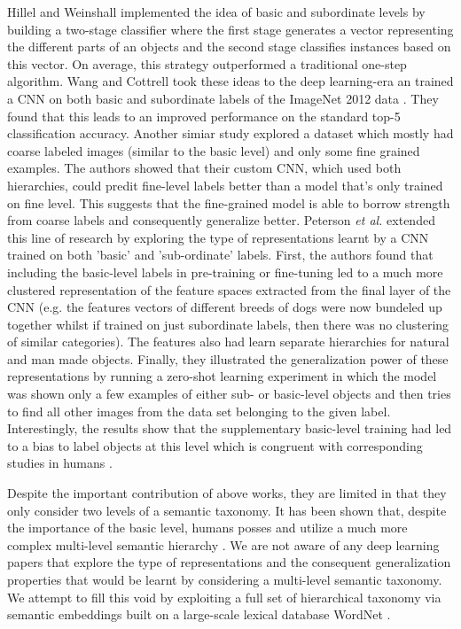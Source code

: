 \documentclass[12pt]{report}
\begin{document}
Hillel and Weinshall \cite{Hillel2007} implemented the idea of basic and subordinate levels by building a two-stage classifier where the first stage generates a vector representing the different parts of an objects and the second stage classifies instances based on this vector. On average, this strategy outperformed a traditional one-step algorithm. Wang and Cottrell \cite{Wang2015} took these ideas to the deep learning-era an trained a CNN on both basic and subordinate labels of the ImageNet 2012 data \cite{Russakovsky2015}. They found that this leads to an improved performance on the standard top-5 classification accuracy. Another simiar study \cite{Lei2018} explored a dataset which mostly had coarse labeled images (similar to the basic level) and only some fine grained examples. The authors showed that their custom CNN, which used both hierarchies, could predit fine-level labels better than a model that's only trained on fine level. This suggests that the fine-grained model is able to borrow strength from coarse labels and consequently generalize better. Peterson \textit{et al.} extended this line of research by exploring the type of representations learnt by a CNN trained on both 'basic' and 'sub-ordinate' labels. First, the authors found that including the basic-level labels in pre-training or fine-tuning led to a much more clustered representation of the feature spaces extracted from the final layer of the CNN (e.g. the features vectors of different breeds of dogs were now bundeled up together whilst if trained on just subordinate labels, then there was no clustering of similar categories). The features also had learn separate hierarchies for natural and man made objects. Finally, they illustrated the generalization power of these representations by running a zero-shot learning experiment in which the model was shown only a few examples of either sub- or basic-level objects and then tries to find all other images from the data set belonging to the given label. Interestingly, the results show that the supplementary basic-level training had led to a bias to label objects at this level which is congruent with corresponding studies in humans \cite{Xu2000}.

Despite the important contribution of above works, they are limited in that they only consider two levels of a semantic taxonomy. It has been shown that, despite the importance of the basic level, humans posses and utilize a much more complex multi-level semantic hierarchy \cite{Joliceur1984}. We are not aware of any deep learning papers that explore the type of representations and the consequent generalization properties that would be learnt by considering a multi-level semantic taxonomy. We attempt to fill this void by exploiting a full set of hierarchical taxonomy via semantic embeddings built on a large-scale lexical database WordNet \cite{Princeton2010}.
\end{document}
